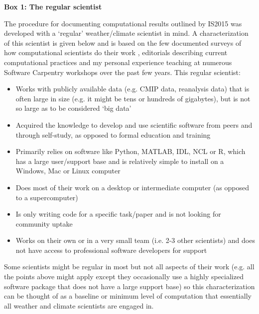 \textbf{Box 1: The regular scientist}

The procedure for documenting computational results outlined by IS2015 was developed with a `regular' weather/climate scientist in mind. A characterization of this scientist is given below and is based on the few documented surveys of how computational scientists do their work \citep{Hannay2009,Stodden2010,Momcheva2015}, editorials describing current computational practices \citep[e.g.][]{Easterbrook2014} and my personal experience teaching at numerous Software Carpentry workshops \citep{Wilson2014} over the past few years. This regular scientist:
\begin{itemize}
\item Works with publicly available data (e.g. CMIP data, reanalysis data) that is often large in size (e.g. it might be tens or hundreds of gigabytes), but is not so large as to be considered `big data' 
\item Acquired the knowledge to develop and use scientific software from peers and through self-study, as opposed to formal education and training
\item Primarily relies on software like Python, MATLAB, IDL, NCL or R, which has a large user/support base and is relatively simple to install on a Windows, Mac or Linux computer
\item Does most of their work on a desktop or intermediate computer (as opposed to a supercomputer)
\item Is only writing code for a specific task/paper and is not looking for community uptake  
\item Works on their own or in a very small team (i.e. 2-3 other scientists) and does not have access to professional software developers for support
\end{itemize}

Some scientists might be regular in most but not all aspects of their work (e.g. all the points above might apply except they occasionally use a highly specialized software package that does not have a large support base) so this characterization can be thought of as a baseline or minimum level of computation that essentially all weather and climate scientists are engaged in.  

  
  
  
  
  
  
  
  
  